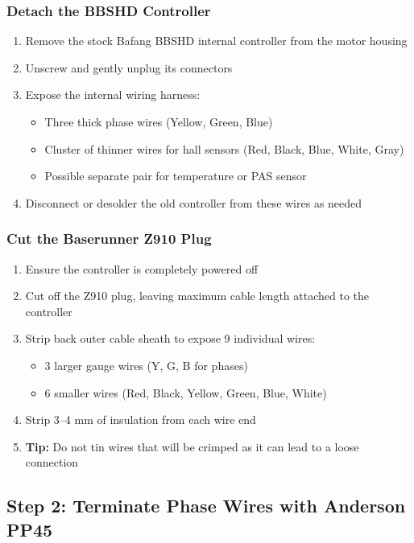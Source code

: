 \documentclass[11pt,a4paper]{article}
\newcommand{\tip}[1]{\textcolor{tipcolor}{\textbf{Tip:} #1}}
\begin{document}
\subsubsection{Detach the BBSHD Controller}
\begin{enumerate}
    \item Remove the stock Bafang BBSHD internal controller from the motor housing
    \item Unscrew and gently unplug its connectors
    \item Expose the internal wiring harness:
    \begin{itemize}
        \item Three thick phase wires (Yellow, Green, Blue)
        \item Cluster of thinner wires for hall sensors (Red, Black, Blue, White, Gray)
        \item Possible separate pair for temperature or PAS sensor
    \end{itemize}
    \item Disconnect or desolder the old controller from these wires as needed
\end{enumerate}

\subsubsection{Cut the Baserunner Z910 Plug}
\begin{enumerate}
    \item Ensure the controller is completely powered off
    \item Cut off the Z910 plug, leaving maximum cable length attached to the controller
    \item Strip back outer cable sheath to expose 9 individual wires:
    \begin{itemize}
        \item 3 larger gauge wires (Y, G, B for phases)
        \item 6 smaller wires (Red, Black, Yellow, Green, Blue, White)
    \end{itemize}
    \item Strip 3--4 mm of insulation from each wire end
    \item \tip{Do not tin wires that will be crimped as it can lead to a loose connection}
\end{enumerate}

\subsection{Step 2: Terminate Phase Wires with Anderson PP45}
\end{document}
